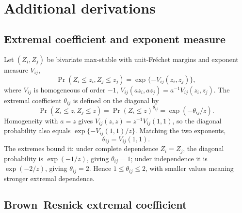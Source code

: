 \appendix
\section{Additional derivations}\label{app:mathematics}


\subsection{Extremal coefficient and exponent measure}\label{app:exponent}

Let \((Z_i,Z_j)\) be bivariate max-stable with unit-Fr\'echet margins and exponent measure \(V_{ij}\),
\[
    \Pr(Z_i\le z_i,Z_j\le z_j)=\exp\{-V_{ij}(z_i,z_j)\},
\]
where \(V_{ij}\) is homogeneous of order \(-1\), \(V_{ij}(az_i,az_j)=a^{-1}V_{ij}(z_i,z_j)\). The extremal coefficient \(\theta_{ij}\) is defined on the diagonal by
\[
    \Pr(Z_i\le z,Z_j\le z)=\Pr(Z_i\le z)^{\theta_{ij}}=\exp(-\theta_{ij}/z).
\]
Homogeneity with \(a=z\) gives \(V_{ij}(z,z)=z^{-1}V_{ij}(1,1)\), so the diagonal probability also equals \(\exp\{-V_{ij}(1,1)/z\}\). Matching the two exponents,
\[
    \theta_{ij}=V_{ij}(1,1).
\]
The extremes bound it: under complete dependence \(Z_i=Z_j\), the diagonal probability is \(\exp(-1/z)\), giving \(\theta_{ij}=1\); under independence it is \(\exp(-2/z)\), giving \(\theta_{ij}=2\). Hence \(1\le\theta_{ij}\le2\), with smaller values meaning stronger extremal dependence.

\subsection{Brown--Resnick extremal coefficient}\label{app:br-theta}

